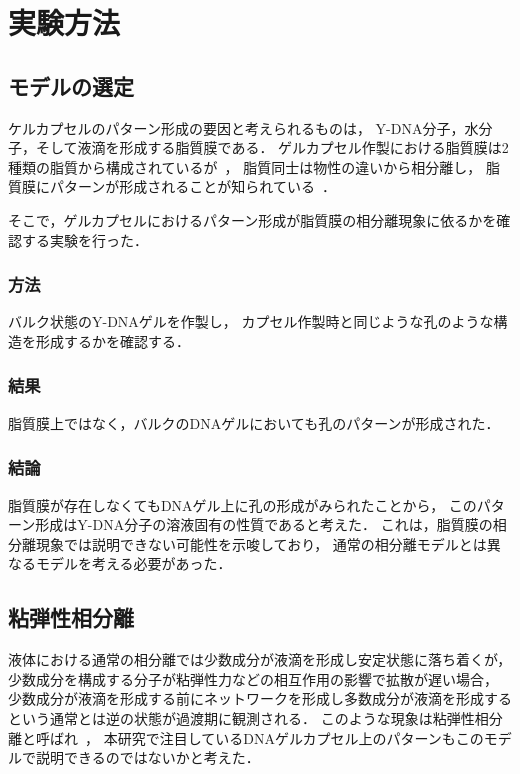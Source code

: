 \chapter{実験方法}

\section{モデルの選定}
ケルカプセルのパターン形成の要因と考えられるものは，
Y-DNA分子，水分子，そして液滴を形成する脂質膜である．
ゲルカプセル作製における脂質膜は2種類の脂質から構成されているが~\cite{morita2017formation}，
脂質同士は物性の違いから相分離し，
脂質膜にパターンが形成されることが知られている~\cite{yanagisawa2014multiple}．

そこで，ゲルカプセルにおけるパターン形成が脂質膜の相分離現象に依るかを確認する実験を行った．

\subsection{方法}
バルク状態のY-DNAゲルを作製し，
カプセル作製時と同じような孔のような構造を形成するかを確認する．

\subsection{結果}
脂質膜上ではなく，バルクのDNAゲルにおいても孔のパターンが形成された．

\subsection{結論}
脂質膜が存在しなくてもDNAゲル上に孔の形成がみられたことから，
このパターン形成はY-DNA分子の溶液固有の性質であると考えた．
これは，脂質膜の相分離現象では説明できない可能性を示唆しており，
通常の相分離モデルとは異なるモデルを考える必要があった．

\section{粘弾性相分離}
液体における通常の相分離では少数成分が液滴を形成し安定状態に落ち着くが，
少数成分を構成する分子が粘弾性力などの相互作用の影響で拡散が遅い場合，
少数成分が液滴を形成する前にネットワークを形成し多数成分が液滴を形成するという通常とは逆の状態が過渡期に観測される．
このような現象は粘弾性相分離と呼ばれ~\cite{tanaka2000viscoelastic}，
本研究で注目しているDNAゲルカプセル上のパターンもこのモデルで説明できるのではないかと考えた．

